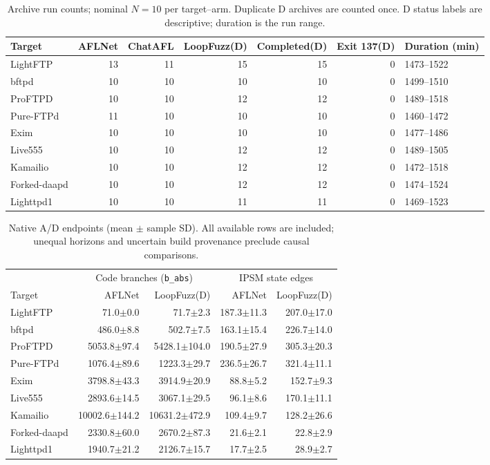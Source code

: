 \begin{table}[!tbp]
\centering\small
\caption{Archive run counts; nominal $N=10$ per target--arm. Duplicate D archives are counted once. D status labels are descriptive; duration is the run range.}
\label{tab:observed_inventory}
\begin{tabular}{lrrrrrl}
\toprule
Target & AFLNet & ChatAFL & LoopFuzz(D) & Completed(D) & Exit 137(D) & Duration (min) \\
\midrule
LightFTP & 13 & 11 & 15 & 15 & 0 & 1473--1522 \\
bftpd & 10 & 10 & 10 & 10 & 0 & 1499--1510 \\
ProFTPD & 10 & 10 & 12 & 12 & 0 & 1489--1518 \\
Pure-FTPd & 11 & 10 & 10 & 10 & 0 & 1460--1472 \\
Exim & 10 & 10 & 10 & 10 & 0 & 1477--1486 \\
Live555 & 10 & 10 & 12 & 12 & 0 & 1489--1505 \\
Kamailio & 10 & 10 & 12 & 12 & 0 & 1472--1518 \\
Forked-daapd & 10 & 10 & 12 & 12 & 0 & 1474--1524 \\
Lighttpd1 & 10 & 10 & 11 & 11 & 0 & 1469--1523 \\
\bottomrule
\end{tabular}
\end{table}
\begin{table}[!tbp]
\centering\small
\caption{Native A/D endpoints (mean $\pm$ sample SD). All available rows are included; unequal horizons and uncertain build provenance preclude causal comparisons.}
\label{tab:observed_endpoints}
\begin{tabular}{lrrrr}
\toprule
 & \multicolumn{2}{c}{Code branches (\texttt{b\_abs})} & \multicolumn{2}{c}{IPSM state edges} \\
Target & AFLNet & LoopFuzz(D) & AFLNet & LoopFuzz(D) \\
\midrule
LightFTP & 71.0$\pm$0.0 & 71.7$\pm$2.3 & 187.3$\pm$11.3 & 207.0$\pm$17.0 \\
bftpd & 486.0$\pm$8.8 & 502.7$\pm$7.5 & 163.1$\pm$15.4 & 226.7$\pm$14.0 \\
ProFTPD & 5053.8$\pm$97.4 & 5428.1$\pm$104.0 & 190.5$\pm$27.9 & 305.3$\pm$20.3 \\
Pure-FTPd & 1076.4$\pm$89.6 & 1223.3$\pm$29.7 & 236.5$\pm$26.7 & 321.4$\pm$11.1 \\
Exim & 3798.8$\pm$43.3 & 3914.9$\pm$20.9 & 88.8$\pm$5.2 & 152.7$\pm$9.3 \\
Live555 & 2893.6$\pm$14.5 & 3067.1$\pm$29.5 & 96.1$\pm$8.6 & 170.1$\pm$11.1 \\
Kamailio & 10002.6$\pm$144.2 & 10631.2$\pm$472.9 & 109.4$\pm$9.7 & 128.2$\pm$26.6 \\
Forked-daapd & 2330.8$\pm$60.0 & 2670.2$\pm$87.3 & 21.6$\pm$2.1 & 22.8$\pm$2.9 \\
Lighttpd1 & 1940.7$\pm$21.2 & 2126.7$\pm$15.7 & 17.7$\pm$2.5 & 28.9$\pm$2.7 \\
\bottomrule
\end{tabular}
\end{table}
